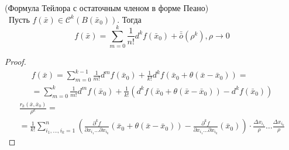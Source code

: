 \begin{theorem}(Формула Тейлора с остаточным членом в форме Пеано)\\\
    Пусть $f(\bar{x})\in \mathcal{C}^k(B(\bar{x}_0))$. Тогда
    \[f(\bar{x})=\sum\limits_{m=0}^{k}\frac{1}{n!}d^k f(\bar{x}_0)+\bar{\bar{o}}{(\rho^k)}, \rho\to 0\] 
\end{theorem} 
\begin{proof}
    \begin{multline*}
        f(\bar{x})=\sum\limits_{m=0}^{k-1}\frac{1}{m!} d^m f(\bar{x}_0)+\frac{1}{k!}d^k f(\bar{x}_0+\theta(\bar{x}-\bar{x}_0))=\\
        =\sum\limits_{m=0}^{k} \frac{1}{m!} d^mf(\bar{x}_0)+\frac{1}{k!}(d^kf(\bar{x}_0+\theta(\bar{x}-\bar{x}_0))-d^k f(\bar{x}_0))
    \end{multline*}
    \begin{multline*}
        \frac{r_k(\bar{x},\bar{x}_0)}{\rho^k}=\\=\frac{1}{k!}\sum\limits_{i_1,\dots, i_k=1}^{n}\left(\frac{\partial^k {f}}{\partial {x_{i_1}}\dots \partial x_{i_k}}(\bar{x}_0+\theta (\bar{x}-\bar{x}_0))-\frac{\partial^k {f}}{\partial {x_{i_1}}\dots \partial x_{i_k}}(\bar{x}_0)\right)\cdot \frac{\Delta x_{i_1}}{\rho}\dots \frac{\Delta x_{i_k}}{\rho}
    \end{multline*}
\end{proof} 
